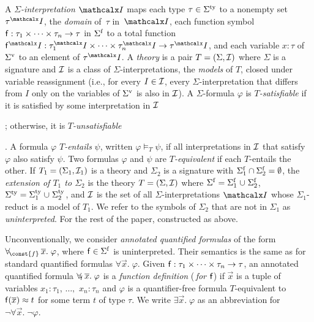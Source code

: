 A \emph{$\Sigma$-interpretation $\I$} %
maps each type $\tau \in \stypes{\Sigma}$ to a nonempty set $\tau^\I$,
the \emph{domain} of~$\tau$ in~$\I$,
each function symbol $\mathsf{f} : \tau_1 \times \cdots \times \tau_n \rightarrow \tau$ in $\sfuns{\Sigma}$
to a total function $\con{f}^\I : \tau_1^\I \times \cdots \times \tau_n^\I \rightarrow \tau^\I$,
and each variable $x:\tau$ of $\svars{\Sigma}$ to an element of $\tau^\I$.
A \emph{theory} is a pair $T = (\Sigma, \Mo)$ where
$\Sigma$ is a signature and ${\mathcal{I}}$ is a class of $\Sigma$-interpretations,
the \emph{models} of $T$, closed under variable reassignment
(i.e., for every $I \in {\mathcal{I}}$, every $\Sigma$-interpretation that differs
from $I$ only on the variables of $\svars \Sigma$ is also in ${\mathcal{I}}$).
A $\Sigma$-formula $\varphi$ is \emph{$T$-satisfiable}
if it is satisfied by some interpretation in ${\mathcal{I}}$\begin{rep};
otherwise, it is \emph{$T$-unsatisfiable}\end{rep}.
A formula $\varphi$ \emph{$T$-entails} $\psi$, written $\varphi \models_T \psi$,
if all interpretations in ${\mathcal{I}}$ that satisfy $\varphi$ also satisfy $\psi$.
Two formulas $\varphi$ and $\psi$ are \emph{$T$-equivalent} 
if each $T$-entails the other.
If $T_1 = (\Sigma_1, \Mo_1)$ is a theory and $\Sigma_2$ is a signature 
with $\sfuns{\Sigma_1} \cap \sfuns{\Sigma_2} = \emptyset$,
the \emph{extension of $T_1$ to $\Sigma_2$} is the theory $T = (\Sigma, \Mo)$ where 
$\sfuns{\Sigma} = \sfuns{\Sigma_1} \cup \sfuns{\Sigma_2}$,
$\stypes{\Sigma} = \stypes{\Sigma_1} \cup \stypes{\Sigma_2}$,
and ${\mathcal{I}}$ is the set of all $\Sigma$-interpretations $\I$
whose $\Sigma_1$-reduct is a model of $T_1$.
We refer to the symbols of $\Sigma_2$ that are not in $\Sigma_1$ as \emph{uninterpreted}.
For the rest of the paper,  constructed as above.

Unconventionally,
we consider \emph{annotated quantified formulas} of the form
$\forallf{\const{f}} \vec x.\; \varphi$, where $\con{f} \in \sfuns{\Sigma}$ is
uninterpreted. Their
semantics is the same as for standard quantified formulas $\forall \vec x.\; \varphi$.
Given $\mathsf{f} : \tau_1 \times \cdots \times \tau_n \rightarrow \tau$,
an annotated
quantified formula $\forall_{\!\mathsf{f}\:} \overline{x}.\; \varphi$ is a \emph{function definition}
(\,\emph{for $\mathsf{f}$}\vthinspace) if $\vec x$ is a tuple of variables
$x_1 : \tau_1$, $\ldots,$ $x_n : \tau_n$
and $\varphi$ is a quantifier-free formula 
$T$-equivalent to $\mathsf{f}( \overline{x} ) \approx t$ for some term $t$ of type $\tau$.
We write $\exists
\vec x.\; \varphi$ as an abbreviation for $\neg \forall \vec x.\; \neg \varphi$.

